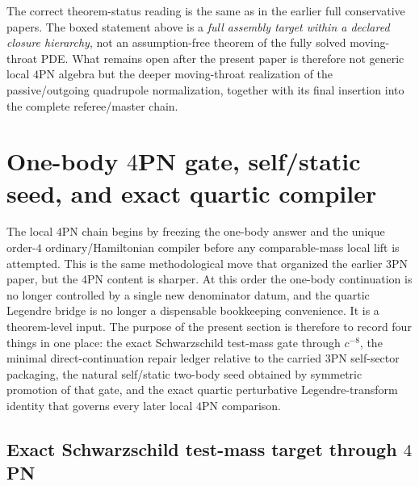 \documentclass[11pt]{article}
\begin{document}
The correct theorem-status reading is the same as in the earlier full
conservative papers.  The boxed statement above is a \emph{full assembly target
within a declared closure hierarchy}, not an assumption-free theorem of the
fully solved moving-throat PDE.  What remains open after the present paper is
therefore not generic local $4$PN algebra but the deeper moving-throat
realization of the passive/outgoing quadrupole normalization, together with its
final insertion into the complete referee/master chain.


\section{One-body \texorpdfstring{$4$}{4}PN gate, self/static seed, and exact quartic compiler}
\label{sec:onebody}

The local $4$PN chain begins by freezing the one-body answer and the unique
order-$4$ ordinary/Hamiltonian compiler before any comparable-mass local lift is
attempted.  This is the same methodological move that organized the earlier
$3$PN paper, but the $4$PN content is sharper.  At this order the one-body
continuation is no longer controlled by a single new denominator datum, and the
quartic Legendre bridge is no longer a dispensable bookkeeping convenience.  It
is a theorem-level input.  The purpose of the present section is therefore to
record four things in one place: the exact Schwarzschild test-mass gate through
$c^{-8}$, the minimal direct-continuation repair ledger relative to the carried
$3$PN self-sector packaging, the natural self/static two-body seed obtained by
symmetric promotion of that gate, and the exact quartic perturbative
Legendre-transform identity that governs every later local $4$PN comparison.

\subsection{Exact Schwarzschild test-mass target through \texorpdfstring{$4$}{4}PN}
\label{sec:onebody-schwarzschild}
\end{document}
